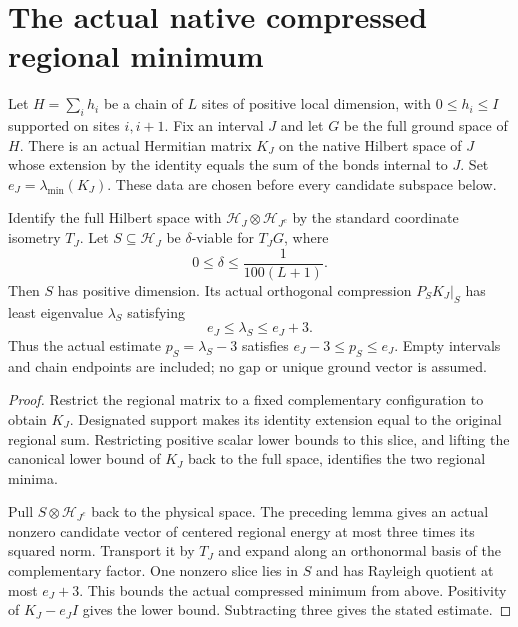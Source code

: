 \section{The actual native compressed regional minimum}

\begin{lemma}
    \label{lem:native_regional_compressed_energy_estimate}
    \leanok
    Let $H=\sum_i h_i$ be a chain of $L$ sites of positive local
    dimension, with $0\le h_i\le I$ supported on sites $i,i+1$.
    Fix an interval $J$ and let $G$ be the full ground space of $H$.
    There is an actual Hermitian matrix $K_J$ on the native Hilbert
    space of $J$ whose extension by the identity equals the sum of
    the bonds internal to $J$. Set $e_J=\lambda_{\min}(K_J)$.
    These data are chosen before every candidate subspace below.

    Identify the full Hilbert space with
    $\mathcal H_J\otimes\mathcal H_{J^c}$ by the standard coordinate
    isometry $T_J$. Let $S\subseteq\mathcal H_J$ be $\delta$-viable
    for $T_JG$, where
    \[
        0\le\delta\le\frac{1}{100(L+1)}.
    \]
    Then $S$ has positive dimension. Its actual orthogonal compression
    $P_SK_J|_S$ has least eigenvalue $\lambda_S$ satisfying
    \[
        e_J\le\lambda_S\le e_J+3.
    \]
    Thus the actual estimate $p_S=\lambda_S-3$ satisfies
    $e_J-3\le p_S\le e_J$. Empty intervals and chain endpoints are
    included; no gap or unique ground vector is assumed.
\end{lemma}
\begin{proof}\leanok
    Restrict the regional matrix to a fixed complementary configuration
    to obtain $K_J$. Designated support makes its identity extension
    equal to the original regional sum. Restricting positive scalar
    lower bounds to this slice, and lifting the canonical lower bound
    of $K_J$ back to the full space, identifies the two regional minima.

    Pull $S\otimes\mathcal H_{J^c}$ back to the physical space. The
    preceding lemma gives an actual nonzero candidate vector of
    centered regional energy at most three times its squared norm.
    Transport it by $T_J$ and expand along an orthonormal basis of
    the complementary factor. One nonzero slice lies in $S$ and
    has Rayleigh quotient at most $e_J+3$. This bounds the actual
    compressed minimum from above. Positivity of $K_J-e_JI$ gives
    the lower bound. Subtracting three gives the stated estimate.
\end{proof}

